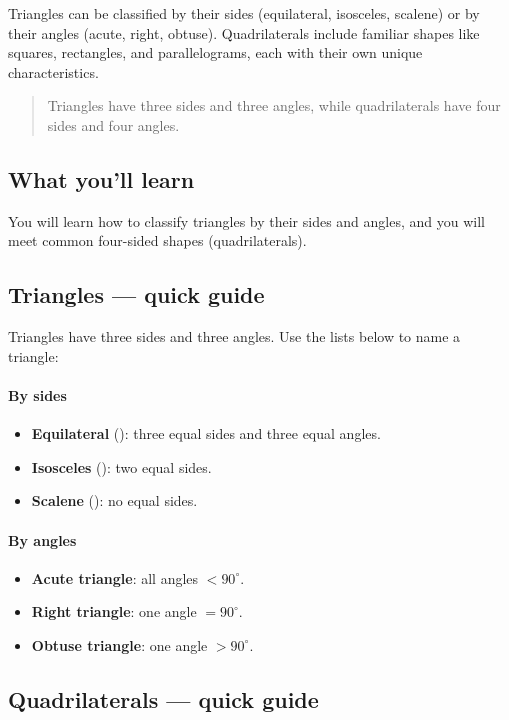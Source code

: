 Triangles can be classified by their sides (equilateral, isosceles, scalene) or
by their angles (acute, right, obtuse). Quadrilaterals include familiar shapes
like squares, rectangles, and parallelograms, each with their own unique
characteristics.

\blockquote{Triangles have three sides and three angles, while quadrilaterals have
four sides and four angles.}

\subsection{What you'll learn}

You will learn how to classify triangles by their sides and angles, and you will
meet common four-sided shapes (quadrilaterals).

\subsection{Triangles — quick guide}

Triangles have three sides and three angles. Use the lists below to name a triangle:

\paragraph{By sides}
\begin{itemize}
  \item \textbf{Equilateral} (): three equal sides and three equal angles.
  \item \textbf{Isosceles} (): two equal sides.
  \item \textbf{Scalene} (): no equal sides.
\end{itemize}

\paragraph{By angles}
\begin{itemize}
  \item \textbf{Acute triangle}: all angles \(<90^\circ\).
  \item \textbf{Right triangle}: one angle \(=90^\circ\).
  \item \textbf{Obtuse triangle}: one angle \(>90^\circ\).
\end{itemize}

\subsection{Quadrilaterals — quick guide}

